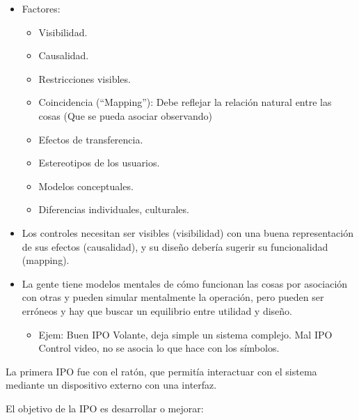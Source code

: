 \documentclass[12pt, twoside, openright]{report} %
\begin{document}
    \begin{itemize}
    
    \item
      Factores:

      \begin{itemize}
      
      \item
        Visibilidad.
      \item
        Causalidad.
      \item
        Restricciones visibles.
      \item
        Coincidencia (``Mapping''): Debe reflejar la relación natural
        entre las cosas (Que se pueda asociar observando)
      \item
        Efectos de transferencia.
      \item
        Estereotipos de los usuarios.
      \item
        Modelos conceptuales.
      \item
        Diferencias individuales, culturales.
      \end{itemize}
    \item
      Los controles necesitan ser visibles (visibilidad) con una buena
      representación de sus efectos (causalidad), y su diseño debería
      sugerir su funcionalidad (mapping).
    \item
      La gente tiene modelos mentales de cómo funcionan las cosas por
      asociación con otras y pueden simular mentalmente la operación,
      pero pueden ser erróneos y hay que buscar un equilibrio entre
      utilidad y diseño.

      \begin{itemize}
      
      \item
        Ejem: Buen IPO Volante, deja simple un sistema complejo. Mal IPO
        Control video, no se asocia lo que hace con los símbolos.
      \end{itemize}
    \end{itemize}

	La primera IPO fue con el ratón, que permitía interactuar con el
    sistema mediante un dispositivo externo con una interfaz.

	El objetivo de la IPO es desarrollar o mejorar:
\end{document}
